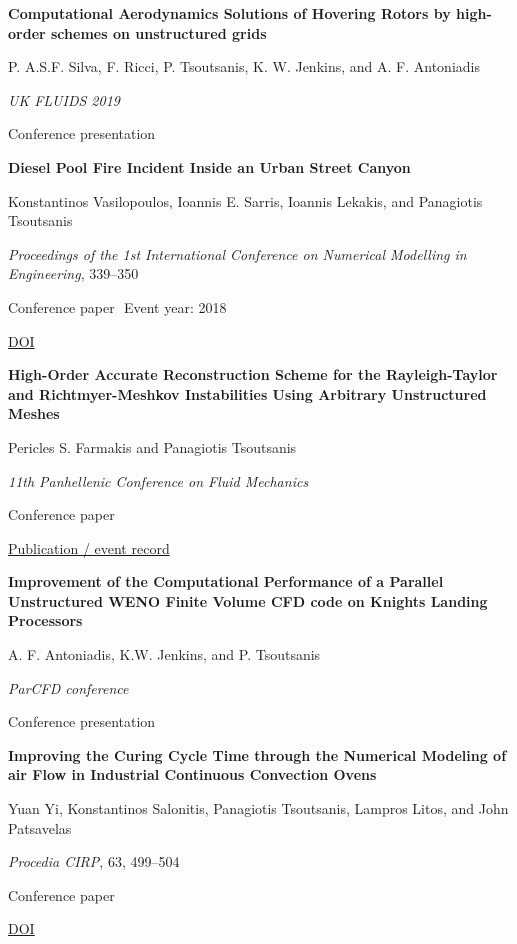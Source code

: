 \documentclass[11pt,a4paper]{article}
\newlength{\cventrysep}
\newenvironment{cventry}{%
  \par\noindent\begin{minipage}{\linewidth}
  \RaggedRight\fontsize{9.8}{12.5}\selectfont
}{\end{minipage}\par\addvspace{\cventrysep}}
\newcommand{\cvtitle}[1]{{\bfseries #1\par}\vspace{1pt}}
\newcommand{\cvdetail}[1]{{#1\par}\vspace{1pt}}
\newcommand{\cvmeta}[1]{{\fontsize{9}{11.5}\selectfont\color{Muted}#1\par}\vspace{1pt}}
\newcommand{\cvlinks}[1]{{\fontsize{9}{11.5}\selectfont #1\par}}
\newcommand{\cvyear}[1]{{\color{Teal}\bfseries\fontsize{11}{13}\selectfont #1\par}\vspace{6pt}}
\begin{document}
\begin{cventry}
\cvyear{2019}
\cvtitle{Computational Aerodynamics Solutions of Hovering Rotors by high-order schemes on unstructured grids}
\cvdetail{P. A.S.F. Silva, F. Ricci, P. Tsoutsanis, K. W. Jenkins, and A. F. Antoniadis}
\cvmeta{\textit{UK FLUIDS 2019}\par Conference presentation}
\end{cventry}

\begin{cventry}
\cvtitle{Diesel Pool Fire Incident Inside an Urban Street Canyon}
\cvdetail{Konstantinos Vasilopoulos, Ioannis E. Sarris, Ioannis Lekakis, and Panagiotis Tsoutsanis}
\cvmeta{\textit{Proceedings of the 1st International Conference on Numerical Modelling in Engineering}, 339--350\par Conference paper\,\textperiodcentered{}\, Event year: 2018}
\cvlinks{\href{https://doi.org/10.1007/978-981-13-2273-0\_26}{DOI}}
\end{cventry}

\begin{cventry}
\cvyear{2018}
\cvtitle{High-Order Accurate Reconstruction Scheme for the Rayleigh-Taylor and Richtmyer-Meshkov Instabilities Using Arbitrary Unstructured Meshes}
\cvdetail{Pericles S. Farmakis and Panagiotis Tsoutsanis}
\cvmeta{\textit{11th Panhellenic Conference on Fluid Mechanics}\par Conference paper}
\cvlinks{\href{https://flow2018.mech.uowm.gr/wp-content/uploads/2018/11/19.-HIGH-ORDER-ACCURATE-RECONSTRUCTION-SCHEME-FOR-THE-RAYLEIGH-TAYLOR-AND-RICHTMYER-MESHKOV-INSTABILITIES-USING-ARBITARILY-UNSTRCTURED-MESHES.pdf}{Publication / event record}}
\end{cventry}

\begin{cventry}
\cvyear{2017}
\cvtitle{Improvement of the Computational Performance of a Parallel Unstructured WENO Finite Volume CFD code on Knights Landing Processors}
\cvdetail{A. F. Antoniadis, K.W. Jenkins, and P. Tsoutsanis}
\cvmeta{\textit{ParCFD conference}\par Conference presentation}
\end{cventry}

\begin{cventry}
\cvtitle{Improving the Curing Cycle Time through the Numerical Modeling of air Flow in Industrial Continuous Convection Ovens}
\cvdetail{Yuan Yi, Konstantinos Salonitis, Panagiotis Tsoutsanis, Lampros Litos, and John Patsavelas}
\cvmeta{\textit{Procedia CIRP}, 63, 499--504\par Conference paper}
\cvlinks{\href{https://doi.org/10.1016/j.procir.2017.03.167}{DOI}}
\end{cventry}
\end{document}
